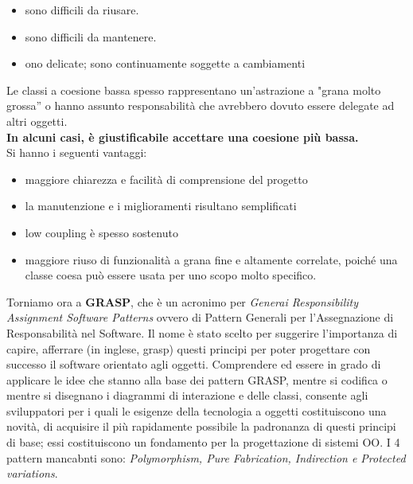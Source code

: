 \documentclass[a4paper,12pt, oneside]{book}
\begin{document}
\begin{enumerate}
\begin{itemize}
\item sono difficili da riusare.
\item sono difficili da mantenere.
\item ono delicate; sono continuamente soggette a cambiamenti
\end{itemize}
Le classi a coesione bassa spesso rappresentano un'astrazione a "grana molto grossa'' o
hanno assunto responsabilità che avrebbero dovuto essere delegate ad altri oggetti.\\
\textbf{In alcuni casi, è giustificabile accettare una coesione più bassa.}\\
Si hanno i seguenti vantaggi:
\begin{itemize}
\item maggiore chiarezza e facilità di comprensione del progetto
\item la manutenzione e i miglioramenti risultano semplificati
\item low coupling è spesso sostenuto
\item maggiore riuso di funzionalità a grana fine e altamente correlate, poiché una classe
coesa può essere usata per uno scopo molto specifico.
\end{itemize}

\end{enumerate}
Torniamo ora a \textbf{GRASP}, che è un acronimo per \textit{Generai Responsibility Assignment Software Patterns} ovvero
di Pattern Generali per l'Assegnazione di Responsabilità nel Software. Il nome è stato
scelto per suggerire l'importanza di capire, afferrare (in inglese, grasp) questi principi per
poter progettare con successo il software orientato agli oggetti.
Comprendere ed essere in grado di applicare le idee che stanno alla base dei pattern
GRASP, mentre si codifica o mentre si disegnano i diagrammi di interazione e delle classi, consente agli sviluppatori per i quali le esigenze della tecnologia a oggetti costituiscono una novità, di acquisire il più rapidamente possibile la padronanza di questi principi
di base; essi costituiscono un fondamento per la progettazione di sistemi OO. I 4 pattern mancabnti sono: \textit{Polymorphism, Pure Fabrication, Indirection e Protected variations}.\\
\end{document}

